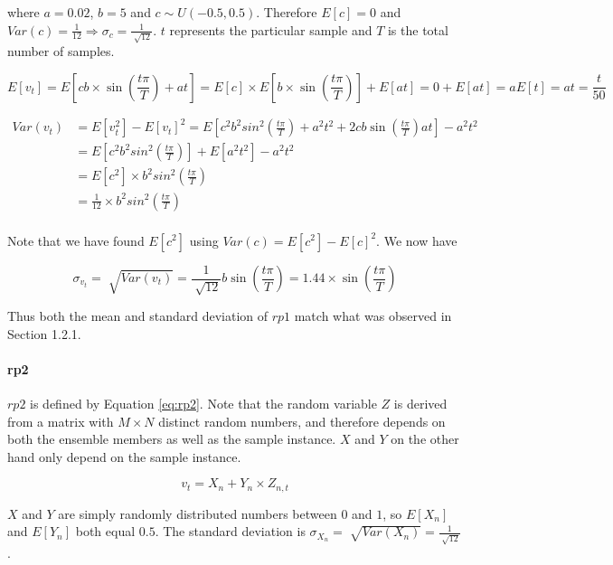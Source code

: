 where $a=0.02$, $b=5$ and $c\sim U(-0.5,0.5)$. Therefore $E[c]=0$ and $Var(c)=\frac{1}{12} \Rightarrow \sigma_c=\frac{1}{\sqrt[]{12}}$. $t$ represents the particular sample and $T$ is the total number of samples.

\begin{equation}
E[v_t]=E[cb \times \sin(\frac{t\pi}{T})+at]=E[c] \times E[b \times \sin(\frac{t\pi}{T})]+E[at]=0+E[at]=aE[t]=at=\frac{t}{50}
\end{equation}

\begin{align} %
Var(v_t) &= E[v_t^2]-E[v_t]^2 = E[c^2b^2sin^2(\frac{t\pi}{T})+a^2t^2+2cb\sin(\frac{t\pi}{T})at]-a^2t^2 \\
&= E[c^2b^2sin^2(\frac{t\pi}{T})]+E[a^2t^2]-a^2t^2 \\
&= E[c^2] \times b^2sin^2(\frac{t\pi}{T}) \\
&= \frac{1}{12} \times b^2sin^2(\frac{t\pi}{T}) \\
\end{align}

Note that we have found $E[c^2]$ using $Var(c)=E[c^2]-E[c]^2$. We now have

\begin{equation}
\sigma_{v_t}=\sqrt[]{Var(v_t)}=\frac{1}{\sqrt[]{12}}b\sin(\frac{t\pi}{T})=1.44 \times \sin(\frac{t\pi}{T})
\end{equation}

Thus both the mean and standard deviation of $rp1$ match what was observed in Section 1.2.1.


\paragraph{rp2}

$rp2$ is defined by Equation \ref{eq:rp2}. Note that the random variable $Z$ is derived from a matrix with $M \times N$ distinct random numbers, and therefore depends on both the ensemble members as well as the sample instance. $X$ and $Y$ on the other hand only depend on the sample instance.

\begin{equation} %
\label{eq:rp2}
v_t = X_n + Y_n \times Z_{n,t}
\end{equation}

$X$ and $Y$ are simply randomly distributed numbers between $0$ and $1$, so $E[X_n]$ and $E[Y_n]$ both equal $0.5$. The standard deviation is $\sigma_{X_n}=\sqrt[]{Var(X_n)}=\frac{1}{\sqrt[]{12}}$.\\

